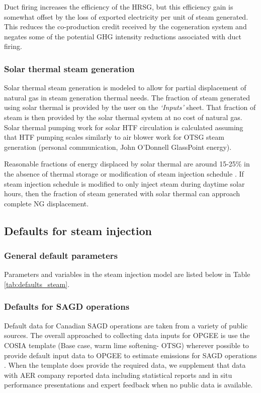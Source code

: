 \documentclass[11pt]{report}
\newcommand{\marg}[1]{{\footnotesize\textit{\textcolor{stanford}{'#1'}}}}
\newcommand{\marginnote}[1]{\marginpar{\marg{#1}}}
\newcommand{\sheet}[1]{\textit{`{#1}'}}
\begin{document}
Duct firing increases the efficiency of the HRSG, but this efficiency gain is somewhat offset by the loss of exported electricity per unit of steam generated. This reduces the co-production credit received by the cogeneration system and negates some of the potential GHG intensity reductions associated with duct firing.


\subsubsection{Solar thermal steam generation}

\marginnote{Steam Generation 2.4}  Solar thermal steam generation is modeled to allow for partial displacement of natural gas in steam generation thermal needs.  The fraction of steam generated using solar thermal is provided by the user on the \sheet{Inputs} sheet. \marginnote{Inputs 1.4.13}  That fraction of steam is then provided by the solar thermal system at no cost of natural gas. Solar thermal pumping work for solar HTF circulation is calculated assuming that HTF pumping scales similarly to air blower work for OTSG steam generation (personal communication, John O'Donnell GlassPoint energy).\marginnote{Steam Generation 2.4.2.2}

Reasonable fractions of energy displaced by solar thermal are around 15-25\% in the absence of thermal storage or modification of steam injection schedule \cite{Wang2016, Sandler2014, Palmer2015}. If steam injection schedule is modified to only inject steam during daytime solar hours, then the fraction of steam generated with solar thermal can approach complete NG displacement.

\subsection{Defaults for steam injection}

\subsubsection{General default parameters}

Parameters and variables in the steam injection model are listed below in Table \ref{tab:defaults_steam}.


\subsubsection{Defaults for SAGD operations}

Default data for Canadian SAGD operations are taken from a variety of public sources.  The overall approached to collecting data inputs for OPGEE is use the COSIA template (Base case, warm lime softening- OTSG) \cite{COSIA2014} wherever possible to provide default input data to OPGEE to estimate emissions for SAGD operations \cite{COSIA2014}. When the template does provide the required data, we supplement that data with AER company reported data including statistical reports \cite{AERvar} and in situ performance presentations \cite{AERvarISPP} and expert feedback when no public data is available.
\end{document}

